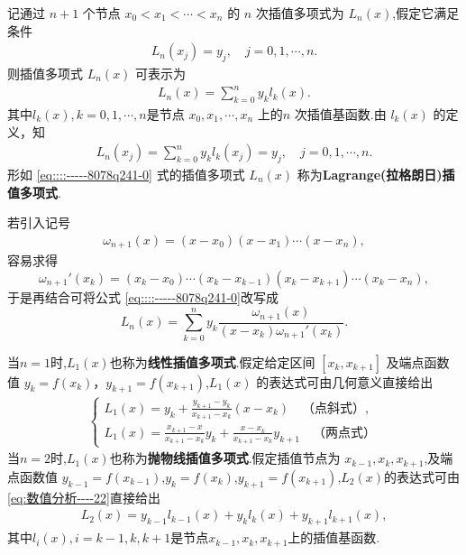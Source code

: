 \documentclass[../../main.tex]{subfiles}
\begin{document}
\begin{theorem}
记通过 $n + 1$ 个节点 $x_0 < x_1 < \cdots < x_n$ 的 $n$ 次插值多项式为 $L_n(x)$,假定它满足条件 
\begin{align}
L_n(x_j) = y_j, \quad j = 0, 1, \cdots, n.\label{equation::::----9812792387--89274}
\end{align}
则插值多项式 $L_n(x)$ 可表示为
\begin{align}
L_n(x) = \sum_{k = 0}^n y_k l_k(x).\label{eq::::-----8078q241-0}
\end{align}
其中$l_k(x),k=0,1,\cdots,n$是节点 $x_0, x_1, \cdots, x_n$ 上的$n$ 次插值基函数.由 $l_k(x)$ 的定义，知 
\begin{align}
L_n(x_j) = \sum_{k = 0}^n y_k l_k(x_j) = y_j, \quad j = 0, 1, \cdots, n.\label{eq:数值分析----22}
\end{align}
形如 \eqref{eq::::-----8078q241-0} 式的插值多项式 $L_n(x)$ 称为\textbf{Lagrange(拉格朗日)插值多项式}.

若引入记号 
\begin{align}
\omega_{n + 1}(x) = (x - x_0)(x - x_1) \cdots (x - x_n),\label{eq:::::-------------2.10}
\end{align}
容易求得 
\[
\omega_{n + 1}'(x_k) = (x_k - x_0) \cdots (x_k - x_{k - 1})(x_k - x_{k + 1}) \cdots (x_k - x_n),
\]
于是再结合可将公式 \eqref{eq::::-----8078q241-0}改写成 
\[
L_n(x) = \sum_{k = 0}^n y_k \frac{\omega_{n + 1}(x)}{(x - x_k) \omega_{n + 1}'(x_k)}.
\]
\end{theorem}
\begin{remark}
当$n=1$时,$L_1(x)$也称为\textbf{线性插值多项式}.假定给定区间 $[x_k, x_{k + 1}]$ 及端点函数值 $y_k = f(x_k)$，$y_{k + 1} = f(x_{k + 1})$,$L_1(x)$ 的表达式可由几何意义直接给出 
\begin{align}
\begin{cases} 
L_1(x) = y_k + \frac{y_{k + 1} - y_k}{x_{k + 1} - x_k}(x - x_k) \quad \text{（点斜式）}, \\ 
L_1(x) = \frac{x_{k + 1} - x}{x_{k + 1} - x_k} y_k + \frac{x - x_k}{x_{k + 1} - x_k} y_{k + 1} \quad \text{（两点式）} 
\end{cases}\label{eq::---8978980678--891213--2.1}
\end{align}
当$n=2$时,$L_1(x)$也称为\textbf{抛物线插值多项式}.假定插值节点为 $x_{k - 1}, x_k, x_{k + 1}$,及端点函数值 $y_{k-1} = f(x_{k-1})$,$y_k=f(x_k)$,$y_{k + 1} = f(x_{k + 1})$,$L_2(x)$的表达式可由\eqref{eq:数值分析----22}直接给出
\begin{align}\label{eq:数值分析-2.5}
L_2\left( x \right) =y_{k-1}l_{k-1}\left( x \right) +y_kl_k\left( x \right) +y_{k+1}l_{k+1}\left( x \right),
\end{align}
其中$l_i\left( x \right) ,i=k-1,k,k+1$是节点$x_{k-1},x_k,x_{k+1}$上的插值基函数.
\end{remark}
\end{document}
